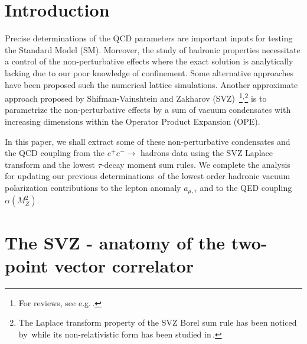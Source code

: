 \documentclass[review]{elsarticle}
\def\nin{\noindent}
\begin{document}
\section{Introduction}
\vspace*{-0.2cm}
Precise determinations of the QCD parameters are important inputs for testing the Standard Model (SM). Moreover, 
the study of hadronic properties necessitate a control of the non-perturbative effects where the exact solution is analytically lacking due to our poor knowledge of confinement. Some alternative approaches have been proposed such the numerical lattice simulations. Another approximate approach proposed by Shifman-Vainshtein and Zakharov (SVZ)\,\,\cite{SVZa}\,\footnote{For reviews, see e.g.\,\cite{ZAKA,SNB1,SNB2,SNREV1,SNREV2,SNB3,RRY,DERAF,BERTa,YNDB,PASC,DOSCH,COL}.}$^,$\footnote{The Laplace transform property of the SVZ Borel sum rule has been noticed by\,\cite{SNR} while its non-relativistic form has been studied in\,\cite{BELLa}. }  is to parametrize the non-perturbative effects by a sum of vacuum condensates with increasing dimensions within the Operator Product Expansion (OPE). 

In this paper, we shall extract some of these non-perturbative condensates and the QCD coupling from the $e^+e^-\to$ hadrons data using the SVZ Laplace transform and the lowest $\tau$-decay moment sum rules.  We complete the analysis for updating our previous determinations\,\cite{CALMET,SN76,SN78,SNamu,SNalfa} of the lowest order hadronic vacuum polarization  contributions to the lepton anomaly  $a_{\mu,\tau}$ and to the QED coupling $\alpha(M_Z^2)$.

\section{The SVZ - anatomy of the two-point vector correlator}
\vspace*{-0.2cm}
\end{document}
